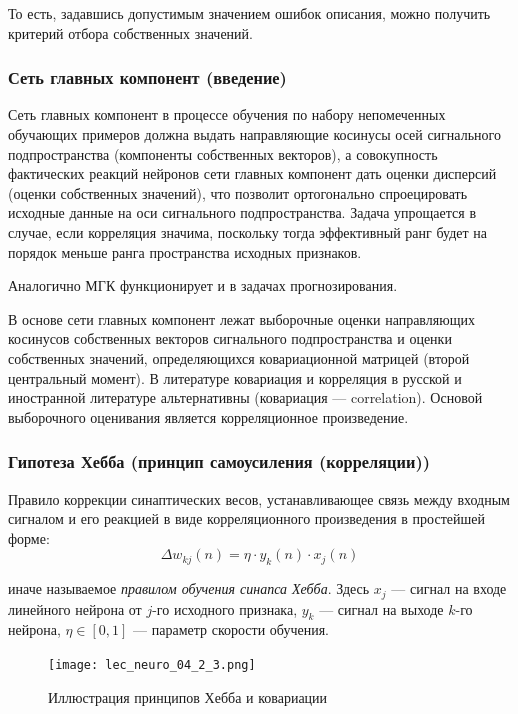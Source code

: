 \documentclass{article}
\numberwithin{equation}{subsection}
\begin{document}
То есть, задавшись допустимым значением ошибок описания, можно получить критерий отбора
собственных значений.




\subsubsection{Сеть главных компонент (введение)}

Сеть главных компонент в процессе обучения по набору непомеченных обучающих примеров
должна выдать направляющие косинусы осей сигнального подпространства (компоненты собственных
векторов), а совокупность фактических реакций нейронов сети главных компонент дать оценки 
дисперсий (оценки собственных значений), что позволит ортогонально спроецировать исходные
данные на оси сигнального подпространства. 
Задача упрощается в случае, если корреляция значима, поскольку тогда эффективный ранг 
будет на порядок меньше ранга пространства исходных признаков.

Аналогично МГК функционирует и в задачах прогнозирования.

В основе сети главных компонент лежат выборочные оценки направляющих косинусов собственных
векторов сигнального подпространства и оценки собственных значений, определяющихся
ковариационной матрицей (второй центральный момент). В литературе ковариация и корреляция
в русской и иностранной литературе альтернативны (ковариация --- correlation).
Основой выборочного оценивания является корреляционное произведение.




\subsubsection{Гипотеза Хебба (принцип самоусиления (корреляции))}

Правило коррекции синаптических весов, устанавливающее связь между входным сигналом
и его реакцией в виде корреляционного произведения в простейшей форме:
\begin{equation}
    \Delta w_{kj} (n) = \eta \cdot y_k(n) \cdot x_j(n)
\end{equation}

\noindent
иначе называемое \textit{правилом обучения синапса Хебба}. 
Здесь $x_j$ --- сигнал на входе линейного нейрона от $j$-го исходного признака, $y_k$ --- 
сигнал на выходе $k$-го нейрона, $\eta \in \left[0, 1\right]$ --- параметр скорости
обучения.

\begin{figure}[htbp]
    \centering
    \texttt{[image: lec\_neuro\_04\_2\_3.png]}
    \caption{Иллюстрация принципов Хебба и ковариации}
    \label{lec_neuro_04_2_3}
\end{figure}
\end{document}

